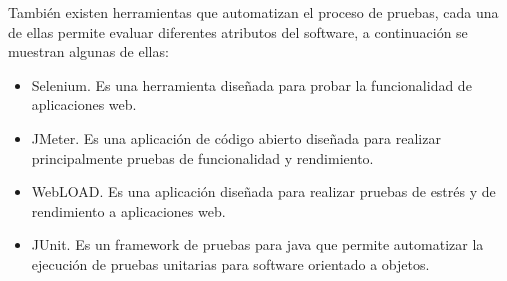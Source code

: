 También existen herramientas que automatizan el proceso de pruebas, cada una de ellas permite evaluar diferentes atributos del software, a continuación se muestran algunas de ellas:

\begin{itemize}
	\item Selenium. Es una herramienta diseñada para probar la funcionalidad de aplicaciones web.
	\item JMeter. Es una aplicación de código abierto diseñada para realizar principalmente pruebas de funcionalidad y rendimiento.
	\item WebLOAD. Es una aplicación diseñada para realizar pruebas de estrés y de rendimiento a aplicaciones web.
	\item JUnit. Es un framework de pruebas para java que permite automatizar la ejecución de pruebas unitarias para software orientado a objetos.
\end{itemize}